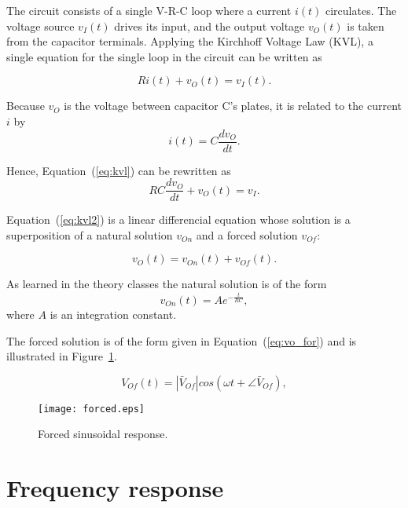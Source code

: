 The circuit consists of a single V-R-C loop where a current $i(t)$ circulates. The
voltage source $v_I(t)$ drives its input, and the output voltage $v_O(t)$ is taken from
the capacitor terminals. Applying the Kirchhoff Voltage Law (KVL), a single
equation for the single loop in the circuit can be written as

\begin{equation}
  Ri(t) + v_O(t) = v_I(t).
  \label{eq:kvl}
\end{equation}

Because $v_O$ is the voltage between capacitor C's plates, it is related to the
current $i$ by
\begin{equation}
  i(t) = C\frac{dv_O}{dt}.
\end{equation}

Hence, Equation~(\ref{eq:kvl}) can be rewritten as
\begin{equation}
  RC\frac{dv_O}{dt} + v_O(t) = v_I.
  \label{eq:kvl2}
\end{equation}

Equation~(\ref{eq:kvl2}) is a linear differencial equation whose solution is a
superposition of a natural solution $v_{On}$ and a forced solution $v_{Of}$:

\begin{equation}
  v_O(t) = v_{On}(t) + v_{Of}(t).
  \label{eq:vo_sol}
\end{equation}

As learned in the theory classes the natural solution is of the form
\begin{equation}
  v_{On}(t) = Ae^{-\frac{t}{RC}},
  \label{eq:vo_nat}
\end{equation}
where $A$ is an integration constant.

The forced solution is of the form given in Equation~(\ref{eq:vo_for}) and is
illustrated in Figure~\ref{fig:forced}.

\begin{equation}
  V_{Of}(t) = |\bar{V}_{Of}| cos(\omega t + \angle \bar{V}_{Of}),
  \label{eq:vo_for}
\end{equation}

\lipsum[1-1]


\begin{figure}[h] \centering
\texttt{[image: forced.eps]}
\caption{Forced sinusoidal response.}
\label{fig:forced}
\end{figure}

\section{Frequency response}

\lipsum[1-1]


